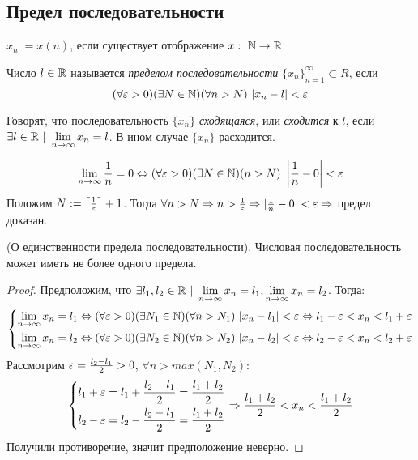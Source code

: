 \subsection{Предел последовательности}

\begin{definition}
    $x_n := x(n)$, если существует отображение $x:\ \mathbb{N} \rightarrow \mathbb{R}$
\end{definition}

\begin{definition}
    Число $l \in \mathbb{R}$ называется \textit{пределом последовательности} $\{x_n\}_{n = 1}^\infty \subset R$, если
    \[
        (\forall \varepsilon > 0)(\exists N \in \mathbb{N})(\forall n > N)\ |x_n - l| < \varepsilon
    \]
\end{definition}

\begin{definition}
    Говорят, что последовательность $\{x_n\}$
    \textit{сходящаяся}, или \textit{сходится} к $l$,
    если $\exists l \in \mathbb{R}\ |\ \lim\limits_{n \to \infty} x_n = l$.
    В ином случае $\{x_n\}$ расходится.
\end{definition}

\begin{example}
    \[
        \liml_{n \to \infty} \frac{1}{n} = 0 \lra (\forall \eps > 0)(\exists N \in \N)(n > N)\ \left|\frac{1}{n} - 0\right| < \eps
    \]
    Положим $N := \left\lceil\frac{1}{\varepsilon}\right\rceil + 1$. Тогда $\forall n > N \Rightarrow n > \frac{1}{\varepsilon} \Rightarrow |\frac{1}{n} - 0| < \varepsilon \Rightarrow$ предел доказан.
\end{example}

\begin{theorem}(О единственности предела последовательности).
    Числовая последовательность может иметь не более одного предела.
\end{theorem}

\begin{proof}
    Предположим, что $\exists l_1, l_2 \in \mathbb{R}\ |
    \ \lim\limits_{n \to \infty} x_n = l_1, \lim\limits_{n \to \infty} x_n = l_2$. Тогда:
    \[
        \left\{\begin{aligned}
        \lim\limits_{n \to \infty} x_n = l_1 \Leftrightarrow (\forall \varepsilon > 0)
        (\exists N_1 \in \mathbb{N})(\forall n > N_1)\ |x_n - l_1| < \varepsilon
        \Leftrightarrow l_1 - \varepsilon < x_n < l_1 + \varepsilon
        \\
        \lim\limits_{n \to \infty} x_n = l_2 \Leftrightarrow (\forall \varepsilon > 0)
        (\exists N_2 \in \mathbb{N})(\forall n > N_2)\ |x_n - l_2| < \varepsilon
        \Leftrightarrow l_2 - \varepsilon < x_n < l_2 + \varepsilon
        \end{aligned}\right.
    \]
    Рассмотрим $\varepsilon = \frac{l_2 - l_1}{2} > 0$, $\forall n > max(N_1, N_2)$:
    \[
        \left\{\begin{aligned}
        l_1 + \varepsilon = l_1 + \frac{l_2 - l_1}{2} = \frac{l_1 + l_2}{2}
        \\
        l_2 - \varepsilon = l_2 - \frac{l_2 - l_1}{2} = \frac{l_1 + l_2}{2}
        \end{aligned}\right.
        \Rightarrow \frac{l_1 + l_2}{2} < x_n < \frac{l_1 + l_2}{2}
    \]
    Получили противоречие, значит предположение неверно.
\end{proof}

